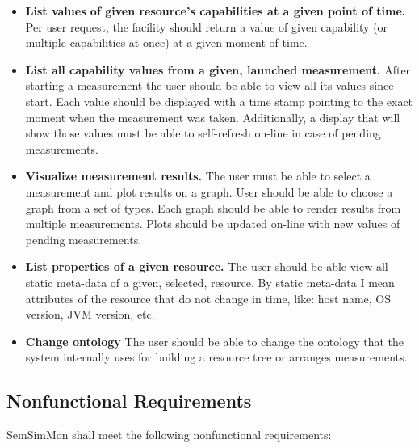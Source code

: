 \begin{itemize}
\item {\bf List values of given resource's capabilities at a given point of time.}
Per user request, the facility should return a value of given capability (or multiple capabilities at once) at a given moment of time.

\item {\bf List all capability values from a given, launched measurement.}
After starting a measurement the user should be able to view all its values since start. Each value should be displayed with a time stamp pointing to the exact moment when the measurement was taken. Additionally, a display that will show those values must be able to self-refresh on-line in case of pending measurements.

\item {\bf Visualize measurement results.}
The user must be able to select a measurement and plot results on a graph. User should be able to choose a graph from a set of types. Each graph should be able to render results from multiple measurements. Plots should be updated on-line with new values of pending measurements.

\item {\bf List properties of a given resource.}
The user should be able view all static meta-data of a given, selected, resource. By static meta-data I mean attributes of the resource that do not change in time, like: host name, OS version, JVM version, etc.

\item {\bf Change ontology}
The user should be able to change the ontology that the system internally uses for building a resource tree or arranges measurements.

\end{itemize}

\subsection{Nonfunctional Requirements}
\label{subsec:NonFunctionalRequirements}

SemSimMon shall meet the following nonfunctional requirements:

